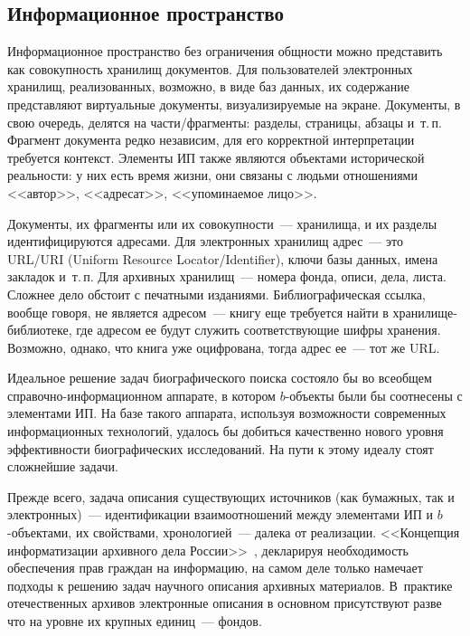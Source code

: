\begin{multicols}{2}
\subsection{Информационное пространство}
  
  Информационное пространство без ограничения общности можно 
представить как совокупность хранилищ документов. Для пользователей 
электронных хранилищ, реализованных, возможно, в виде баз данных, их 
содержание пред\-став\-ля\-ют виртуальные документы, визуализируемые на 
экране. Документы, в свою очередь, делятся на час\-ти/фрагменты: разделы, 
страницы, абзацы и~т.\,п.\linebreak
 Фрагмент документа редко независим, для его\linebreak 
корректной интерпретации требуется контекст. Элементы ИП также являются 
объектами исторической реальности: у них есть время жизни, они связаны с 
людьми отношениями <<автор>>, <<адресат>>, <<упоминаемое лицо>>.
  
  Документы, их фрагменты или их совокупности~--- хранилища, и их разделы 
идентифицируются адресами. Для электронных хранилищ адрес~--- это 
URL/URI (Uniform Resource Locator/Identifier), ключи базы данных, имена закладок и~т.\,п. Для архивных 
хранилищ~--- номера фонда, описи, дела, листа. Сложнее дело обстоит с 
печатными изданиями. Библиографическая ссылка, вообще говоря, не является 
адресом~--- книгу еще требуется \mbox{найти} в хранилище-библиотеке, где адресом 
ее будут служить соответствующие шиф\-ры хранения. Возможно, однако, что 
книга уже оциф\-ро\-ва\-на, тогда адрес ее~--- тот же URL.
  
  Идеальное решение задач биографического поиска состояло бы во всеобщем 
справочно-ин\-фор\-ма\-ци\-он\-ном аппарате, в котором $b$-объекты были бы 
соотнесены с элементами ИП. На базе такого аппарата, используя возможности 
современных информационных технологий, удалось бы добиться качественно 
нового уровня эффективности биографических исследований. На пути к этому 
идеалу стоят сложнейшие задачи.
  
  Прежде всего, задача описания существующих источников (как бумажных, 
так и электронных)~--- идентификации взаимоотношений между элементами 
ИП и $b$-объектами, их свойствами, хронологией~--- далека от реализации. 
<<Концепция информатизации архивного дела России>>~\cite{12mar}, 
декларируя необходимость обеспечения прав граждан на информацию, на 
самом деле только намечает подходы к решению задач научного описания 
архивных материалов. В~практике отечественных архивов электронные 
описания в основном присутствуют разве что на уровне их крупных единиц~--- 
фондов. 
  

\end{multicols}
